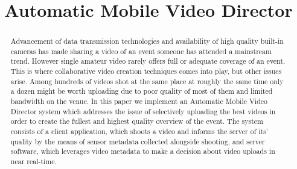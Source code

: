 \documentclass[conference]{IEEEtran}
\begin{document}
\title{Automatic Mobile Video Director}

\author{
\and
\and
\and
}


\maketitle

\begin{abstract}
Advancement of data transmission technologies and availability of high quality built-in cameras 
has made sharing a video of an event someone has attended a mainstream trend.
However single amateur video rarely offers full or adequate coverage of an event.
This is where collaborative video creation techniques comes into play, but other issues arise.
Among hundreds of videos shot at the same place at roughly the same time only 
a dozen might be worth uploading due to poor quality of most of them and limited bandwidth on the venue.
In this paper we implement an Automatic Mobile Video Director system which addresses the issue of 
selectively uploading the best videos in order to create the fullest and highest quality overview of the event.
The system consists of a client application, which shoots a video and informs the server of its' quality 
by the means of sensor metadata collected alongside shooting,
and server software, which leverages video metadata to make a decision about video uploads in near real-time.

\end{abstract}
\end{document}
